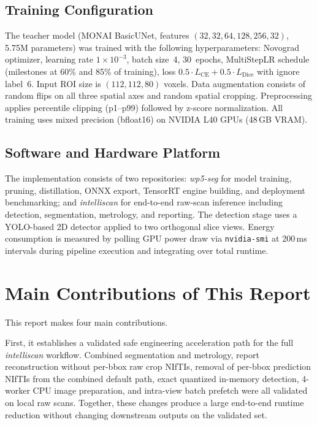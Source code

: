 \subsection{Training Configuration}

The teacher model (MONAI BasicUNet, features $(32, 32, 64, 128, 256, 32)$, 5.75M parameters) was trained with the following hyperparameters: Novograd optimizer, learning rate $1 \times 10^{-3}$, batch size~4, 30~epochs, MultiStepLR schedule (milestones at 60\% and 85\% of training), loss $0.5 \cdot L_\text{CE} + 0.5 \cdot L_\text{Dice}$ with ignore label~6. Input ROI size is $(112, 112, 80)$ voxels. Data augmentation consists of random flips on all three spatial axes and random spatial cropping. Preprocessing applies percentile clipping (p1--p99) followed by z-score normalization. All training uses mixed precision (bfloat16) on NVIDIA L40 GPUs (48\,GB VRAM).

\subsection{Software and Hardware Platform}

The implementation consists of two repositories: \emph{wp5-seg} for model training, pruning, distillation, ONNX export, TensorRT engine building, and deployment benchmarking; and \emph{intelliscan} for end-to-end raw-scan inference including detection, segmentation, metrology, and reporting. The detection stage uses a YOLO-based 2D detector applied to two orthogonal slice views. Energy consumption is measured by polling GPU power draw via \texttt{nvidia-smi} at 200\,ms intervals during pipeline execution and integrating over total runtime.

\hypertarget{main-contributions-of-this-report}{%
\section{Main Contributions of This
Report}\label{main-contributions-of-this-report}}

This report makes four main contributions.

First, it establishes a validated safe engineering acceleration path for
the full \emph{intelliscan} workflow. Combined segmentation and
metrology, report reconstruction without per-bbox raw crop NIfTIs,
removal of per-bbox prediction NIfTIs from the combined default path,
exact quantized in-memory detection, 4-worker CPU image
preparation, and intra-view batch prefetch were all validated on local
raw scans. Together, these changes produce a large end-to-end runtime
reduction without changing downstream outputs on the validated set.

